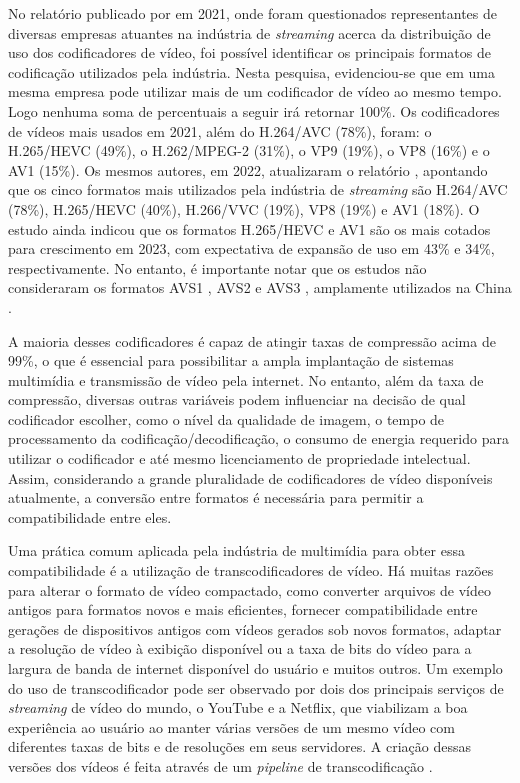 No relatório publicado por \citet{bib:bitmovin_report_2021} em 2021, onde foram questionados representantes de diversas empresas atuantes na indústria de \textit{streaming} acerca da distribuição de uso dos codificadores de vídeo, foi possível identificar os principais formatos de codificação utilizados pela indústria. Nesta pesquisa, evidenciou-se que em uma mesma empresa pode utilizar mais de um codificador de vídeo ao mesmo tempo. Logo nenhuma soma de percentuais a seguir irá retornar 100\%. Os codificadores de vídeos mais usados em 2021, além do H.264/AVC \cite{bib:h264overview2} (78\%), foram: o H.265/HEVC \cite{bib:hevc} (49\%), o H.262/MPEG-2 \cite{bib:mpeg2} (31\%), o VP9 \cite{bib:vp9overview} (19\%), o VP8 \cite{bib:vp8} (16\%) e o AV1 \cite{bib:av1_overview_2021} (15\%). Os mesmos autores, em 2022, atualizaram o relatório \cite{bib:bitmovin_report_2022}, apontando que os cinco formatos mais utilizados pela indústria de \textit{streaming} são H.264/AVC (78\%), H.265/HEVC (40\%), H.266/VVC (19\%), VP8 (19\%) e AV1 (18\%). O estudo ainda indicou que os formatos H.265/HEVC e AV1 são os mais cotados para crescimento em 2023, com expectativa de expansão de uso em 43\% e 34\%, respectivamente. No entanto, é importante notar que os estudos não consideraram os formatos AVS1 \cite{bib:AVS}, AVS2 \cite{bib:avs2} e AVS3 \cite{bib:avs3}, amplamente utilizados na China \cite{bib:china_codecs}.

A maioria desses codificadores é capaz de atingir taxas de compressão acima de 99\%, o que é essencial para possibilitar a ampla implantação de sistemas multimídia e transmissão de vídeo pela internet. No entanto, além da taxa de compressão, diversas outras variáveis podem influenciar na decisão de qual codificador escolher, como o nível da qualidade de imagem, o tempo de processamento da codificação/decodificação, o consumo de energia requerido para utilizar o codificador e até mesmo licenciamento de propriedade intelectual. Assim, considerando a grande pluralidade de codificadores de vídeo disponíveis atualmente, a conversão entre formatos é necessária para permitir a compatibilidade entre eles.

Uma prática comum aplicada pela indústria de multimídia para obter essa compatibilidade é a utilização de transcodificadores de vídeo. Há muitas razões para alterar o formato de vídeo compactado, como converter arquivos de vídeo antigos para formatos novos e mais eficientes, fornecer compatibilidade entre gerações de dispositivos antigos com vídeos gerados sob novos formatos, adaptar a resolução de vídeo à exibição disponível ou a taxa de bits do vídeo para a largura de banda de internet disponível do usuário e muitos outros. Um exemplo do uso de transcodificador pode ser observado por dois dos principais serviços de \textit{streaming} de vídeo do mundo, o YouTube e a Netflix, que viabilizam a boa experiência ao usuário ao manter várias versões de um mesmo vídeo com diferentes taxas de bits e de resoluções em seus servidores. A criação dessas versões dos vídeos é feita através de um \textit{pipeline} de transcodificação \cite{bib:netflix_pipeline}.


